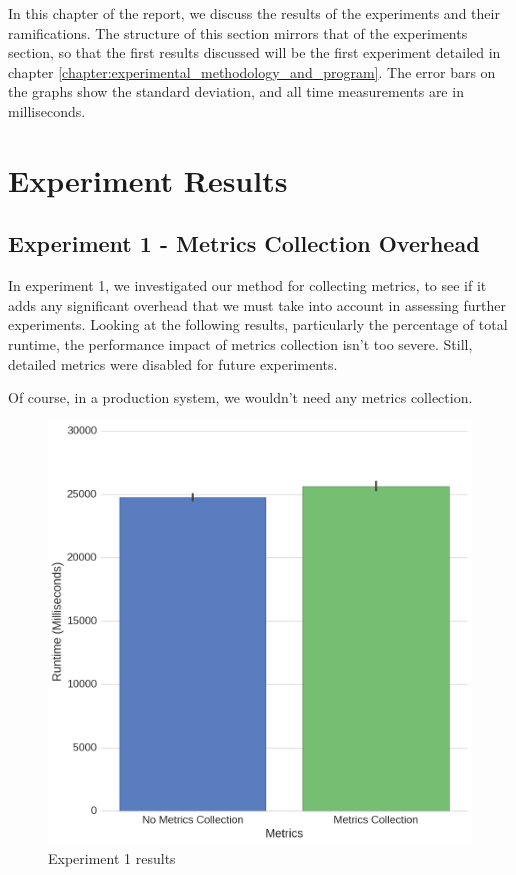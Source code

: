 
In this chapter of the report, we discuss the results of the experiments and their ramifications. The structure of this section mirrors that of the experiments section, so that the first results discussed will be the first experiment detailed in chapter \ref{chapter:experimental_methodology_and_program}. The error bars on the graphs show the standard deviation, and all time measurements are in milliseconds.



\section{Experiment Results}



\subsection{Experiment 1 - Metrics Collection Overhead}

In experiment 1, we investigated our method for collecting metrics, to see if it adds any significant overhead that we must take into account in assessing further experiments. Looking at the following results, particularly the percentage of total runtime, the performance impact of metrics collection isn't too severe. Still, detailed metrics were disabled for future experiments.

Of course, in a production system, we wouldn't need any metrics collection.


\begin{figure}[H]
	\centering
	\includegraphics[width=\textwidth]{graphics/experiment1.png}
	\caption{Experiment 1 results}
	\label{fig:results_ex1}
\end{figure}

